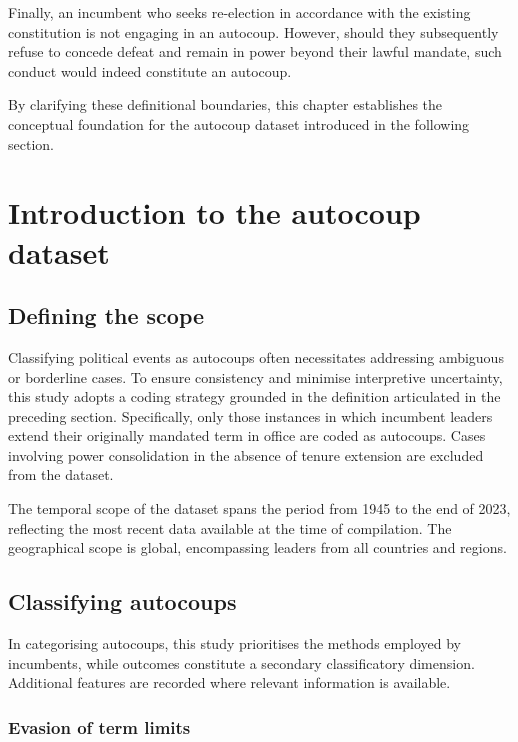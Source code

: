 \documentclass[
  12pt,
]{report}
\begin{document}
Finally, an incumbent who seeks re-election in accordance with the
existing constitution is not engaging in an autocoup. However, should
they subsequently refuse to concede defeat and remain in power beyond
their lawful mandate, such conduct would indeed constitute an autocoup.

By clarifying these definitional boundaries, this chapter establishes
the conceptual foundation for the autocoup dataset introduced in the
following section.

\section{Introduction to the autocoup
dataset}\label{introduction-to-the-autocoup-dataset}

\subsection*{Defining the scope}\label{defining-the-scope}

Classifying political events as autocoups often necessitates addressing
ambiguous or borderline cases. To ensure consistency and minimise
interpretive uncertainty, this study adopts a coding strategy grounded
in the definition articulated in the preceding section. Specifically,
only those instances in which incumbent leaders extend their originally
mandated term in office are coded as autocoups. Cases involving power
consolidation in the absence of tenure extension are excluded from the
dataset.

The temporal scope of the dataset spans the period from 1945 to the end
of 2023, reflecting the most recent data available at the time of
compilation. The geographical scope is global, encompassing leaders from
all countries and regions.

\subsection*{Classifying autocoups}\label{classifying-autocoups}

In categorising autocoups, this study prioritises the methods employed
by incumbents, while outcomes constitute a secondary classificatory
dimension. Additional features are recorded where relevant information
is available.

\subsubsection*{Evasion of term limits}\label{evasion-of-term-limits}
\end{document}

